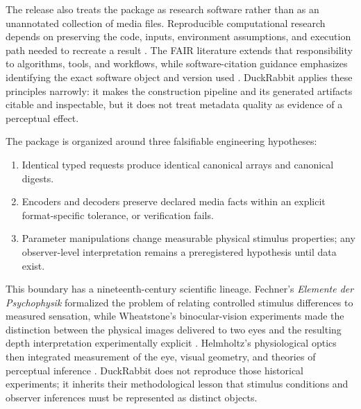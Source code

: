 \documentclass[
  english,
]{article}
\providecommand{\tightlist}{%
  \setlength{\itemsep}{0pt}\setlength{\parskip}{0pt}}
\begin{document}
The release also treats the package as research software rather than as
an unannotated collection of media files. Reproducible computational
research depends on preserving the code, inputs, environment
assumptions, and execution path needed to recreate a result
\citep{sandve2013simple, wilson2014bestpractices}. The FAIR literature
extends that responsibility to algorithms, tools, and workflows, while
software-citation guidance emphasizes identifying the exact software
object and version used
\citep{wilkinson2016fair, lamprecht2020fairsoftware, smith2016software}.
DuckRabbit applies these principles narrowly: it makes the construction
pipeline and its generated artifacts citable and inspectable, but it
does not treat metadata quality as evidence of a perceptual effect.

The package is organized around three falsifiable engineering
hypotheses:

\begin{enumerate}
\def\labelenumi{\arabic{enumi}.}
\tightlist
\item
  Identical typed requests produce identical canonical arrays and
  canonical digests.
\item
  Encoders and decoders preserve declared media facts within an explicit
  format-specific tolerance, or verification fails.
\item
  Parameter manipulations change measurable physical stimulus
  properties; any observer-level interpretation remains a preregistered
  hypothesis until data exist.
\end{enumerate}

This boundary has a nineteenth-century scientific lineage. Fechner's
\emph{Elemente der Psychophysik} formalized the problem of relating
controlled stimulus differences to measured sensation, while
Wheatstone's binocular-vision experiments made the distinction between
the physical images delivered to two eyes and the resulting depth
interpretation experimentally explicit
\citep{fechner1860psychophysics, wheatstone1838binocular}. Helmholtz's
physiological optics then integrated measurement of the eye, visual
geometry, and theories of perceptual inference
\citep{helmholtz1867optics}. DuckRabbit does not reproduce those
historical experiments; it inherits their methodological lesson that
stimulus conditions and observer inferences must be represented as
distinct objects.
\end{document}
